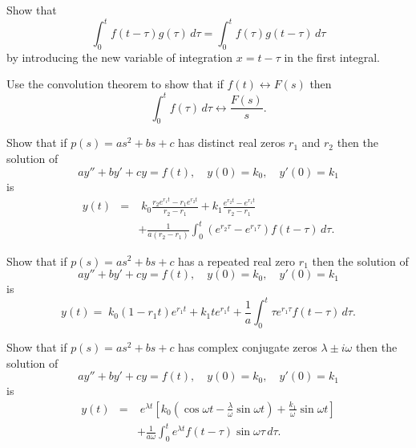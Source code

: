 \documentclass{ximera}
\begin{document}
\begin{problem}\label{exer:8.6.6}
 Show that
$$
\int_0^tf(t-\tau)g(\tau)\,d\tau=\int_0^tf(\tau)g(t-\tau)\,d\tau
$$
by introducing the new variable of integration $x=t-\tau$ in the first
integral.
\end{problem}

\begin{problem}\label{exer:8.6.7} Use the convolution theorem to show that if
$f(t)\leftrightarrow F(s)$ then
$$
\int_0^tf(\tau)\,d\tau\leftrightarrow \frac{F(s)}{s}.
$$
\end{problem}

\begin{problem}\label{exer:8.6.8}
 Show that if $p(s)=as^2+bs+c$ has
distinct real zeros $r_1$ and $r_2$ then the solution of
$$
ay''+by'+cy=f(t),\quad y(0)=k_0,\quad y'(0)=k_1
$$
is
\begin{eqnarray*}
y(t)&=&\; k_0\frac{r_2e^{r_1t}-r_1e^{r_2t}}{r_2-r_1}+k_1\frac{e^{r_2t}-e^{r_1t}
}{r_2-r_1}
\\
&&+\frac{1}{a(r_2-r_1)}\int_0^t(e^{r_2\tau}-e^{r_1\tau})f(t-\tau)\,d\tau.
\end{eqnarray*}
\end{problem}

\begin{problem}\label{exer:8.6.9}
Show that if $p(s)=as^2+bs+c$ has
a repeated  real zero $r_1$ then
 the solution of
$$
ay''+by'+cy=f(t),\quad y(0)=k_0,\quad y'(0)=k_1
$$
is
$$
y(t)=\; k_0(1-r_1t)e^{r_1t}+k_1te^{r_1t}
+\frac{1}{a}\int_0^t\tau
e^{r_1\tau}f(t-\tau)\,d\tau.
$$
\end{problem}

\begin{problem}\label{exer:8.6.10}
 Show that if $p(s)=as^2+bs+c$ has
 complex conjugate zeros $\lambda\pm i\omega$
then the solution of
$$
ay''+by'+cy=f(t),\quad y(0)=k_0,\quad y'(0)=k_1
$$
is
\begin{eqnarray*}
y(t)&=&\;  e^{\lambda t}\left[k_0(\cos\omega t-\frac{\lambda}{\omega}\sin\omega
t)+\frac{k_1}{\omega}\sin\omega t\right]
\\
&&+\frac{1}{a\omega}\int_0^te^{\lambda t}f(t-\tau)\sin\omega\tau\,
d\tau.
\end{eqnarray*}
\end{problem}
\end{document}
